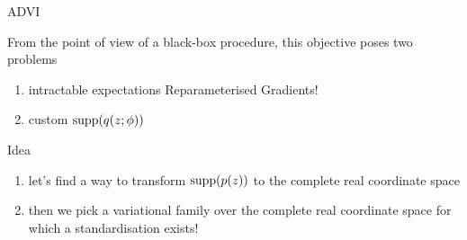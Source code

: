 \documentclass[14pt,dvipsnames]{beamer}
\begin{document}
\begin{frame}{ADVI}
	
	
	
	From the point of view of a black-box procedure, this objective poses two problems
	\begin{enumerate}
		\item intractable expectations \pause Reparameterised Gradients!
		\item custom $\operatorname{supp}(q(z; \phi))$ 
	\end{enumerate}
	
	Idea
	\begin{enumerate}
		\item let's find a way to transform $\operatorname{supp}(p(z))$ to the complete real coordinate space
		\item then we pick a variational family over the complete real coordinate space for which a standardisation exists!
	\end{enumerate}
	
\end{frame}


\begin{frame}[allowframebreaks]


\end{frame}
\end{document}
